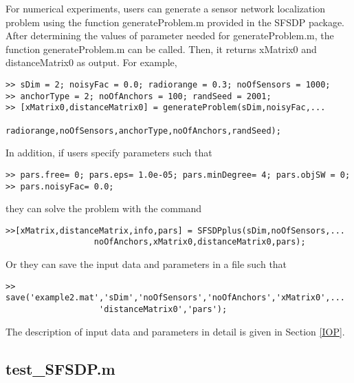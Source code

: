 \documentclass[12pt]{article}
\begin{document}
For numerical experiments, users can generate a sensor network localization problem 
using the function generateProblem.m provided 
in the SFSDP package.
After determining the values of parameter  needed for generateProblem.m, 
the function generateProblem.m can be called.
Then, it returns xMatrix0 and distanceMatrix0 as output.
For example,
\begin{verbatim}
>> sDim = 2; noisyFac = 0.0; radiorange = 0.3; noOfSensors = 1000; 
>> anchorType = 2; noOfAnchors = 100; randSeed = 2001;
>> [xMatrix0,distanceMatrix0] = generateProblem(sDim,noisyFac,... 
                  radiorange,noOfSensors,anchorType,noOfAnchors,randSeed); 
\end{verbatim}
In addition, if  users specify parameters such that 
\begin{verbatim}
>> pars.free= 0; pars.eps= 1.0e-05; pars.minDegree= 4; pars.objSW = 0;
>> pars.noisyFac= 0.0; 
\end{verbatim}
they can solve the problem with the command
\begin{verbatim}
>>[xMatrix,distanceMatrix,info,pars] = SFSDPplus(sDim,noOfSensors,...
                  noOfAnchors,xMatrix0,distanceMatrix0,pars);
\end{verbatim}
Or they can save the input data and parameters  in a file such that 
\begin{verbatim}
>> save('example2.mat','sDim','noOfSensors','noOfAnchors','xMatrix0',...
                   'distanceMatrix0','pars'); 
\end{verbatim}


The description of  input data and parameters in detail is given in Section \ref{IOP}.

\subsection{test\_SFSDP.m}
 
\end{document}
